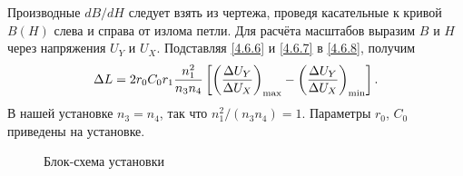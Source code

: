 Производные $dB/dH$ следует взять из чертежа, проведя касательные к кривой
$B(H)$ слева и справа от излома петли. Для расчёта масштабов выразим $B$ и $H$
через напряжения $U_Y$ и $U_X$. Подставляя \eqref{4.6.6} и \eqref{4.6.7} в
\eqref{4.6.8}, получим
\begin{equation}
	\eqmark{4.6.9}
	\Delta L = 2r_0C_0r_1\frac{n^2_1}{n_3n_4}\left[\left(\frac{\Delta
U_Y}{\Delta U_X}\right)_{\rm max} - \left(\frac{\Delta U_Y}{\Delta
U_X}\right)_{\rm min}\right].
\end{equation}
В нашей установке $n_3 = n_4$, так что $n_1^2/ (n_3n_4) = 1$. Параметры $r_0$,
$C_0$ приведены на установке.

\begin{figure}[h!]
    \centering\small
    \caption{Блок-схема установки}
\end{figure}

